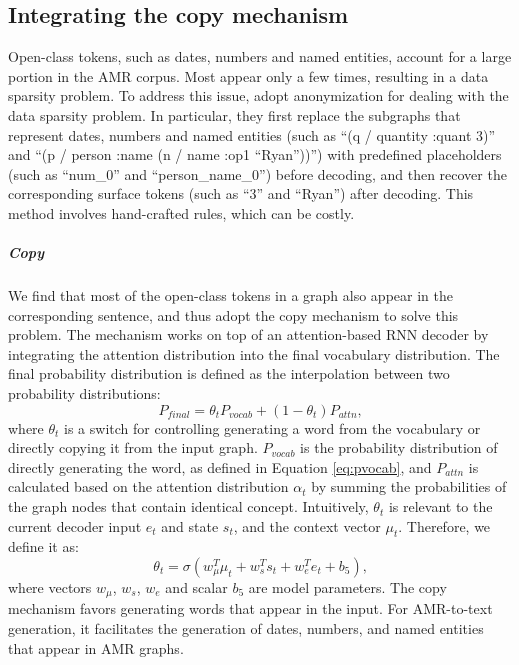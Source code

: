 \documentclass[11pt,a4paper]{article}
\begin{document}
\subsection{Integrating the copy mechanism}
\label{sec:copy}


Open-class tokens, such as dates, numbers and named entities, account for a large portion in the AMR corpus. 
Most appear only a few times, resulting in a data sparsity problem.
To address this issue,  adopt anonymization for dealing with the data sparsity problem.
In particular, they first replace the subgraphs that represent dates, numbers and named entities (such as ``(q / quantity :quant 3)'' and ``(p / person :name (n / name :op1 ``Ryan''))'') with predefined placeholders (such as ``num\_0'' and ``person\_name\_0'') before decoding, and then recover the corresponding surface tokens (such as ``3'' and ``Ryan'') after decoding.
This method involves hand-crafted rules, which can be costly.


\subparagraph{Copy}
We find that most of the open-class tokens in a graph also appear in the corresponding sentence, and thus adopt the copy mechanism \cite{gulcehre-EtAl:2016:P16-1,gu-EtAl:2016:P16-1} to solve this problem.
The mechanism works on top of an attention-based RNN decoder by integrating the attention distribution into the final vocabulary distribution.
The final probability distribution is defined as the interpolation between two probability distributions:
\begin{equation}
P_{final} = \theta_t P_{vocab} + (1-\theta_t) P_{attn}\textrm{,}
\end{equation}
where $\theta_t$ is a switch for controlling generating a word from the vocabulary or directly copying it from the input graph.
$P_{vocab}$ is the probability distribution of directly generating the word, as defined in Equation \ref{eq:pvocab}, and 
$P_{attn}$ is calculated based on the attention distribution $\alpha_t$ by summing the probabilities of the graph nodes that contain identical concept.
Intuitively, $\theta_t$ is relevant to the current decoder input $e_{t}$ and state $s_t$, and the context vector $\mu_t$.
Therefore, we define it as:
\begin{equation}
\theta_t = \sigma(w_\mu^T \mu_t + w_s^T s_t + w_e^T e_{t} + b_5)\textrm{,}
\end{equation}
where vectors $w_\mu$, $w_s$, $w_e$ and scalar $b_{5}$ are model parameters.
The copy mechanism favors generating words that appear in the input.
For AMR-to-text generation, it facilitates the generation of dates, numbers, and named entities that appear in AMR graphs.
\end{document}
